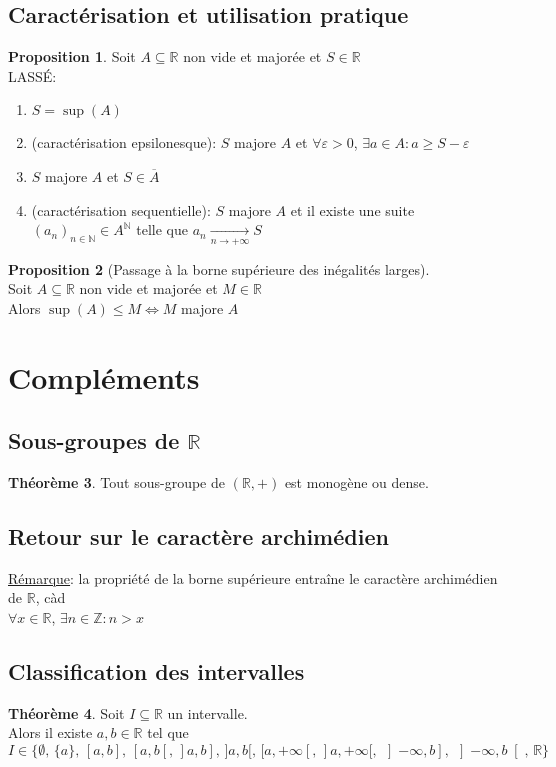 \documentclass[10pt,a4paper]{article}
\theoremstyle{definition}
\newtheorem{proposition}{Proposition}[section]
\newtheorem{theorem}[proposition]{Théorème}
\begin{document}
\subsection{Caractérisation et utilisation pratique}
\begin{proposition}
Soit $A \subseteq \mathbb{R}$ non vide et majorée et $S \in \mathbb{R}$ \\
LASSÉ:
\begin{enumerate}
\item $S = \sup(A)$
\item (caractérisation epsilonesque): $S$ majore $A$ et $\forall \varepsilon > 0$, $\exists a \in A: a \geq S - \varepsilon$
\item $S$ majore $A$ et $S \in \overline{A}$
\item (caractérisation sequentielle): $S$ majore $A$ et il existe une suite $(a_n)_{n \in \mathbb{N}} \in A^\mathbb{N}$ telle que $a_n \xrightarrow[n \to +\infty]{} S$
\end{enumerate}
\end{proposition}
\begin{proposition}[Passage à la borne supérieure des inégalités larges]
\hfill \\
Soit $A \subseteq \mathbb{R}$ non vide et majorée et $M \in \mathbb{R}$ \\
Alors $\sup(A) \leq M \iff M$ majore $A$
\end{proposition}

\pagebreak

\section{Compléments}
\subsection{Sous-groupes de $\mathbb{R}$}
\begin{theorem}
Tout sous-groupe de $(\mathbb{R}, +)$ est monogène ou dense.
\end{theorem}

\subsection{Retour sur le caractère archimédien}
\noindent \uline{Rémarque}: la propriété de la borne supérieure entraîne le caractère archimédien de $\mathbb{R}$, càd \\
$\forall x \in \mathbb{R}$, $\exists n \in \mathbb{Z}: n > x$

\subsection{Classification des intervalles}
\begin{theorem}
Soit $I \subseteq \mathbb{R}$ un intervalle. \\
Alors il existe $a, b \in \mathbb{R}$ tel que
\[ I \in \{ \emptyset,\, \{ a \},\, [a, b],\, [a, b[ ,\, ]a, b],\, ]a ,b[,\, [a, +\infty[,\, ]a, +\infty[,\, \left]-\infty, b\right],\, \left]-\infty, b\right[,\, \mathbb{R} \}\]
\end{theorem}
\end{document}
